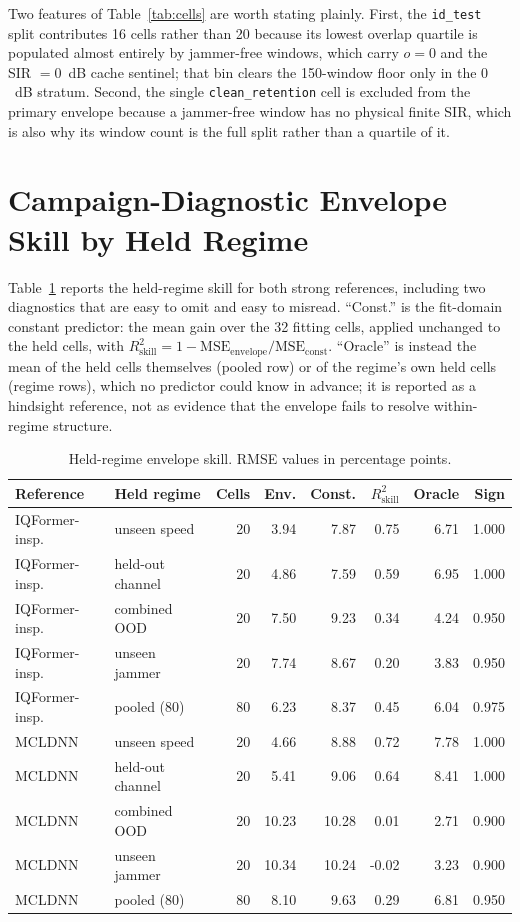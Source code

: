 \documentclass[letterpaper,onecolumn,11pt,journal]{IEEEtran}
\newcommand{\pp}{percentage points}
\begin{document}
Two features of Table~\ref{tab:cells} are worth stating plainly. First, the
\texttt{id\_test} split contributes 16 cells rather than 20 because its lowest
overlap quartile is populated almost entirely by jammer-free windows, which
carry $o=0$ and the SIR $=0$~dB cache sentinel; that bin clears the 150-window
floor only in the $0$~dB stratum. Second, the single
\texttt{clean\_retention} cell is excluded from the primary envelope because a
jammer-free window has no physical finite SIR, which is also why its window
count is the full split rather than a quartile of it.

\section{Campaign-Diagnostic Envelope Skill by Held Regime}
Table~\ref{tab:regime} reports the held-regime skill for both strong
references, including two diagnostics that are easy to omit and easy to
misread. ``Const.'' is the fit-domain constant predictor: the mean gain over
the 32 fitting cells, applied unchanged to the held cells, with
$R^2_{\mathrm{skill}}=1-\mathrm{MSE}_{\mathrm{envelope}}/\mathrm{MSE}_{\mathrm{const}}$.
``Oracle'' is instead the mean of the held cells themselves (pooled row) or of
the regime's own held cells (regime rows), which no predictor could know in
advance; it is reported as a hindsight reference, not as evidence that the
envelope fails to resolve within-regime structure.

\begin{table}[t]
\centering
\caption{Held-regime envelope skill. RMSE values in \pp.}
\label{tab:regime}
\scriptsize
\setlength{\tabcolsep}{2.4pt}
\begin{tabular}{llrrrrrr}
\toprule
Reference & Held regime & Cells & Env. & Const. & $R^2_{\mathrm{skill}}$ & Oracle & Sign\\
\midrule
IQFormer-insp. & unseen speed & 20 & 3.94 & 7.87 & 0.75 & 6.71 & 1.000\\
IQFormer-insp. & held-out channel & 20 & 4.86 & 7.59 & 0.59 & 6.95 & 1.000\\
IQFormer-insp. & combined OOD & 20 & 7.50 & 9.23 & 0.34 & 4.24 & 0.950\\
IQFormer-insp. & unseen jammer & 20 & 7.74 & 8.67 & 0.20 & 3.83 & 0.950\\
IQFormer-insp. & pooled (80) & 80 & 6.23 & 8.37 & 0.45 & 6.04 & 0.975\\
\midrule
MCLDNN & unseen speed & 20 & 4.66 & 8.88 & 0.72 & 7.78 & 1.000\\
MCLDNN & held-out channel & 20 & 5.41 & 9.06 & 0.64 & 8.41 & 1.000\\
MCLDNN & combined OOD & 20 & 10.23 & 10.28 & 0.01 & 2.71 & 0.900\\
MCLDNN & unseen jammer & 20 & 10.34 & 10.24 & -0.02 & 3.23 & 0.900\\
MCLDNN & pooled (80) & 80 & 8.10 & 9.63 & 0.29 & 6.81 & 0.950\\
\bottomrule
\end{tabular}
\end{table}
\end{document}
